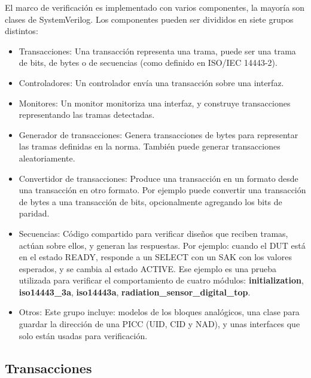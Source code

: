 \documentclass[a4paper, twoside, 11pt]{report}
\begin{document}
El marco de verificación es implementado con varios componentes, la mayoría son clases de SystemVerilog. Los componentes pueden ser divididos en siete grupos distintos:

\begin{itemize}
  \item Transacciones: Una transacción representa una trama, puede ser una trama de bits, de bytes o de secuencias (como definido en ISO/IEC 14443-2).
  \item Controladores: Un controlador envía una transacción sobre una interfaz.
  \item Monitores: Un monitor monitoriza una interfaz, y construye transacciones representando las tramas detectadas.
  \item Generador de transacciones: Genera transacciones de bytes para representar las tramas definidas en la norma. También puede generar transacciones aleatoriamente.
  \item Convertidor de transacciones: Produce una transacción en un formato desde una transacción en otro formato. Por ejemplo puede convertir una transacción de bytes a una transacción de bits, opcionalmente agregando los bits de paridad.
  \item Secuencias: Código compartido para verificar diseños que reciben tramas, actúan sobre ellos, y generan las respuestas. Por ejemplo: cuando el DUT está en el estado READY, responde a un SELECT con un SAK con los valores esperados, y se cambia al estado ACTIVE. Ese ejemplo es una prueba utilizada para verificar el comportamiento de cuatro módulos: \textbf{initialization}, \textbf{iso14443\_3a}, \textbf{iso14443a}, \textbf{radiation\_sensor\_digital\_top}.
  \item Otros: Este grupo incluye: modelos de los bloques analógicos, una clase para guardar la dirección de una PICC (UID, CID y NAD), y unas interfaces que solo están usadas para verificación.
\end{itemize}

\FloatBarrier
\subsection{Transacciones}
\end{document}
